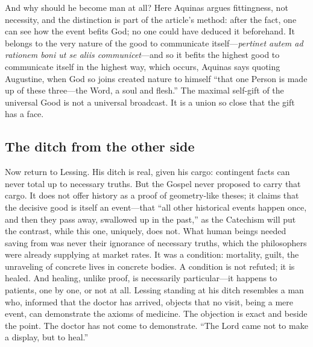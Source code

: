 And why should he become man at all? Here Aquinas argues fittingness, not necessity, and the distinction is part of the article's method: after the fact, one can see how the event befits God; no one could have deduced it beforehand. It belongs to the very nature of the good to communicate itself---\emph{pertinet autem ad rationem boni ut se aliis communicet}---and so it befits the highest good to communicate itself in the highest way, which occurs, Aquinas says quoting Augustine, when God so joins created nature to himself ``that one Person is made up of these three---the Word, a soul and flesh.'' The maximal self-gift of the universal Good is not a universal broadcast. It is a union so close that the gift has a face.

\subsection{The ditch from the other side}

Now return to Lessing. His ditch is real, given his cargo: contingent facts can never total up to necessary truths. But the Gospel never proposed to carry that cargo. It does not offer history as a proof of geometry-like theses; it claims that the decisive good is itself an event---that ``all other historical events happen once, and then they pass away, swallowed up in the past,'' as the Catechism will put the contrast, while this one, uniquely, does not. What human beings needed saving from was never their ignorance of necessary truths, which the philosophers were already supplying at market rates. It was a condition: mortality, guilt, the unraveling of concrete lives in concrete bodies. A condition is not refuted; it is healed. And healing, unlike proof, is necessarily particular---it happens to patients, one by one, or not at all. Lessing standing at his ditch resembles a man who, informed that the doctor has arrived, objects that no visit, being a mere event, can demonstrate the axioms of medicine. The objection is exact and beside the point. The doctor has not come to demonstrate. ``The Lord came not to make a display, but to heal.''

